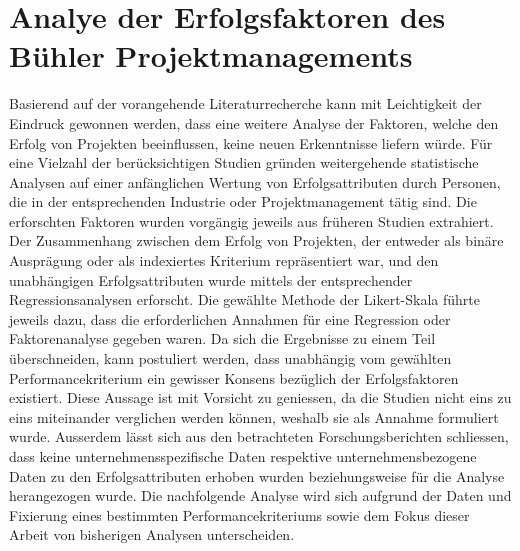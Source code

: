 \documentclass[11pt]{article}
\begin{document}
\section{Analye der Erfolgsfaktoren des Bühler Projektmanagements}\label{drei}
Basierend auf der vorangehende Literaturrecherche kann mit Leichtigkeit der Eindruck gewonnen werden, dass eine weitere Analyse der Faktoren, welche den Erfolg von Projekten beeinflussen, keine neuen Erkenntnisse liefern würde. Für eine Vielzahl der berücksichtigen Studien gründen weitergehende statistische Analysen auf einer anfänglichen Wertung von Erfolgsattributen durch Personen, die in der entsprechenden Industrie oder Projektmanagement tätig sind. Die erforschten Faktoren wurden vorgängig jeweils aus früheren Studien extrahiert. Der Zusammenhang zwischen dem Erfolg von Projekten, der entweder als binäre Ausprägung oder als indexiertes Kriterium repräsentiert war, und den unabhängigen Erfolgsattributen wurde mittels der entsprechender Regressionsanalysen erforscht. Die gewählte Methode der Likert-Skala führte jeweils dazu, dass die erforderlichen Annahmen für eine Regression oder Faktorenanalyse gegeben waren. Da sich die Ergebnisse zu einem Teil überschneiden, kann postuliert werden, dass unabhängig vom gewählten Performancekriterium ein gewisser Konsens bezüglich der Erfolgsfaktoren existiert. Diese Aussage ist mit Vorsicht zu geniessen, da die Studien nicht eins zu eins miteinander verglichen werden können, weshalb sie als Annahme formuliert wurde. Ausserdem lässt sich aus den betrachteten Forschungsberichten schliessen, dass keine unternehmensspezifische Daten respektive unternehmensbezogene Daten zu den Erfolgsattributen erhoben wurden beziehungsweise für die Analyse herangezogen wurde.\newline
Die nachfolgende Analyse wird sich aufgrund der Daten und Fixierung eines bestimmten Performancekriteriums sowie dem Fokus dieser Arbeit von bisherigen Analysen unterscheiden. 
\end{document}

